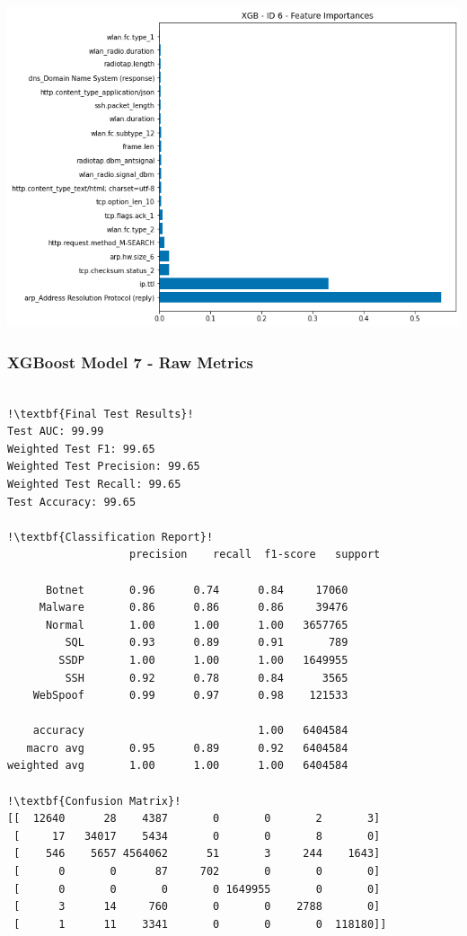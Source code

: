 \begin{appendices}
\begin{lstlisting}[escapechar=!]
\end{lstlisting}
\begin{center}
	\centering
	\includegraphics[width=\textwidth]{Appendices/Images/XGB/Model6/XGB_Model6_FI.png}
\end{center}

\subsubsection{XGBoost Model 7 - Raw Metrics}
\begin{lstlisting}[escapechar=!]

!\textbf{Final Test Results}!
Test AUC: 99.99
Weighted Test F1: 99.65
Weighted Test Precision: 99.65
Weighted Test Recall: 99.65
Test Accuracy: 99.65

!\textbf{Classification Report}!
			       precision    recall  f1-score   support

      Botnet       0.96      0.74      0.84     17060
     Malware       0.86      0.86      0.86     39476
      Normal       1.00      1.00      1.00   3657765
         SQL       0.93      0.89      0.91       789
        SSDP       1.00      1.00      1.00   1649955
         SSH       0.92      0.78      0.84      3565
    WebSpoof       0.99      0.97      0.98    121533

    accuracy                           1.00   6404584
   macro avg       0.95      0.89      0.92   6404584
weighted avg       1.00      1.00      1.00   6404584
    
!\textbf{Confusion Matrix}!    
[[  12640      28    4387       0       0       2       3]
 [     17   34017    5434       0       0       8       0]
 [    546    5657 4564062      51       3     244    1643]
 [      0       0      87     702       0       0       0]
 [      0       0       0       0 1649955       0       0]
 [      3      14     760       0       0    2788       0]
 [      1      11    3341       0       0       0  118180]]


\end{lstlisting}
\end{appendices}
